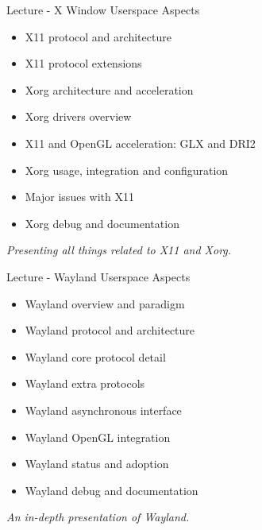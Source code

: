\documentclass[a4paper,12pt,obeyspaces,spaces,hyphens]{article}
\begin{document}
\feagendatwocolumn
{Lecture - X Window Userspace Aspects}
{
  \begin{itemize}
  \item X11 protocol and architecture
  \item X11 protocol extensions
  \item Xorg architecture and acceleration
  \item Xorg drivers overview
  \item X11 and OpenGL acceleration: GLX and DRI2
  \item Xorg usage, integration and configuration
  \item Major issues with X11
  \item Xorg debug and documentation
  \end{itemize}
  \vspace{0.5em}
  {\em Presenting all things related to X11 and Xorg.}
}
{Lecture - Wayland Userspace Aspects}
{
  \begin{itemize}
  \item Wayland overview and paradigm
  \item Wayland protocol and architecture
  \item Wayland core protocol detail
  \item Wayland extra protocols
  \item Wayland asynchronous interface
  \item Wayland OpenGL integration
  \item Wayland status and adoption
  \item Wayland debug and documentation
  \end{itemize}
  \vspace{0.5em}
  {\em An in-depth presentation of Wayland.}
}\\
\end{document}
